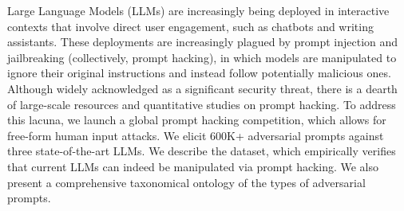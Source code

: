 Large Language Models (LLMs) are increasingly being deployed in interactive contexts that involve direct user engagement, such as chatbots and writing assistants. These deployments are increasingly plagued by prompt injection and jailbreaking (collectively, prompt hacking), in which models are manipulated to ignore their original instructions and instead follow potentially malicious ones. Although widely acknowledged as a significant security threat, there is a dearth of large-scale resources and quantitative studies on prompt hacking. 
% 
To address this lacuna, we launch a global prompt hacking competition, which allows for free-form human input attacks. We elicit 600K+ adversarial prompts against three state-of-the-art LLMs.
%
We describe the dataset, 
which empirically verifies that current LLMs can indeed be manipulated via prompt hacking. We also present a comprehensive taxonomical ontology of the types of adversarial prompts.
%
%
